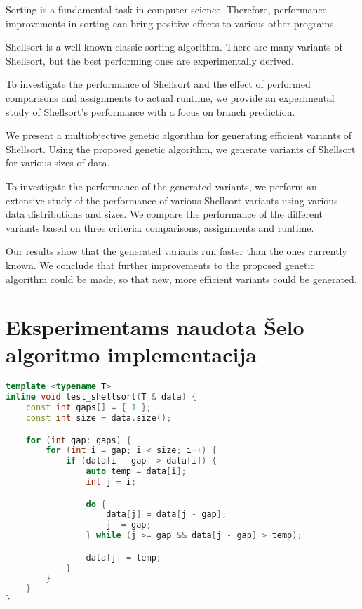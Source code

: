 \documentclass{VUMIFInfBakalaurinis}
\begin{document}

Sorting is a fundamental task in computer science.
Therefore, performance improvements in sorting can bring positive effects to various other programs.

Shellsort is a well-known classic sorting algorithm.
There are many variants of Shellsort, but the best performing ones are experimentally derived.

To investigate the performance of Shellsort and the effect of performed comparisons and assignments to actual runtime,
we provide an experimental study of Shellsort's performance with a focus on branch prediction.

We present a multiobjective genetic algorithm for generating efficient variants of Shellsort.
Using the proposed genetic algorithm, we generate variants of Shellsort for various sizes of data.

To investigate the performance of the generated variants, we perform an extensive
study of the performance of various Shellsort variants using various data distributions and sizes.
We compare the performance of the different variants based on three criteria: comparisons, assignments and runtime.

Our results show that the generated variants run faster than the ones currently known.
We conclude that further improvements to the proposed genetic algorithm could be made,
so that new, more efficient variants could be generated.  


\printbibliography[heading=bibintoc]

\appendix  %

\section{Eksperimentams naudota Šelo algoritmo implementacija}

\begin{lstlisting}[label={alg:test_shellsort},language=C++]
template <typename T>
inline void test_shellsort(T & data) {
    const int gaps[] = { 1 };
    const int size = data.size();

    for (int gap: gaps) {
        for (int i = gap; i < size; i++) {
            if (data[i - gap] > data[i]) {
                auto temp = data[i];
                int j = i;

                do {
                    data[j] = data[j - gap];
                    j -= gap;
                } while (j >= gap && data[j - gap] > temp);

                data[j] = temp;
            }
        }
    }
}
\end{lstlisting}
\end{document}
